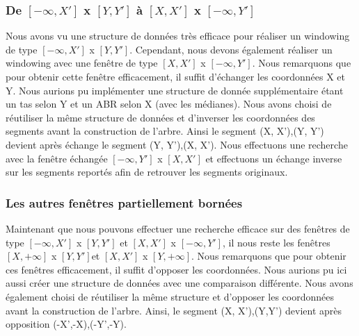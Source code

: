 \documentclass[10pt,a4paper]{article}
\begin{document}
\subsubsection{De $[-\infty, X']$ x $[Y, Y']$ à $[X, X']$ x $[-\infty, Y']$}
Nous avons vu une structure de données très efficace pour réaliser un windowing de type $[-\infty, X']$ x $[Y, Y']$. Cependant, nous devons également réaliser un windowing avec une fenêtre de type $[X, X']$ x $[-\infty, Y']$. Nous remarquons que pour obtenir cette fenêtre efficacement, il suffit d'échanger les coordonnées X et Y. Nous aurions pu implémenter une structure de donnée supplémentaire étant un tas selon Y et un ABR selon X (avec les médianes). Nous avons choisi de réutiliser la même structure de données et d'inverser les coordonnées des segments avant la construction de l'arbre. Ainsi le segment (X, X'),(Y, Y') devient après échange le segment (Y, Y'),(X, X'). Nous effectuons une recherche avec la fenêtre échangée $[-\infty, Y']$ x $[X, X']$ et effectuons un échange inverse sur les segments reportés afin de retrouver les segments originaux.

\subsubsection{Les autres fenêtres partiellement bornées}
Maintenant que nous pouvons effectuer une recherche efficace sur des fenêtres de type $[-\infty, X']$ x $[Y, Y']$ et $[X, X']$ x $[-\infty, Y']$, il nous reste les fenêtres $[X, +\infty]$ x $[Y, Y']$et $[X, X']$ x $[Y, +\infty]$. Nous remarquons que pour obtenir ces fenêtres efficacement, il suffit d'opposer les coordonnées. Nous aurions pu ici aussi créer une structure de données avec une comparaison différente. Nous avons également choisi de réutiliser la même structure et d'opposer les coordonnées avant la construction de l'arbre. Ainsi, le segment (X, X'),(Y,Y') devient après opposition (-X',-X),(-Y',-Y).
\end{document}
